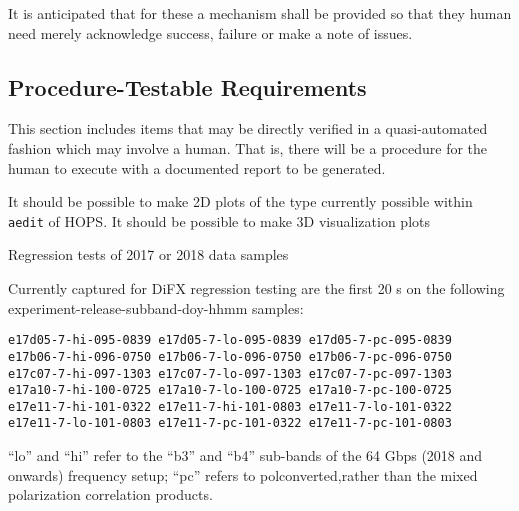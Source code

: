 It is anticipated that for these a mechanism shall be provided
so that they human need merely acknowledge success, failure or
make a note of issues.

\subsection{Procedure-Testable Requirements}
\label{sec:procedure}

This section includes items that may be directly verified in a quasi-automated
fashion which may involve a human.  That is, there will be a procedure for the
human to execute with a documented report to be generated.

\begin{description}
 It should be possible to make 2D plots of the type
    currently possible within \texttt{\ac{aedit}} of \ac{HOPS}.
 It should be possible to make 3D visualization plots

 Regression tests of 2017 or 2018 data samples

    \FIXME[more]

\end{description}

Currently captured for \ac{DiFX} regression testing are the first 20 s
on the following experiment-release-subband-doy-hhmm samples:
\begin{verbatim}
e17d05-7-hi-095-0839 e17d05-7-lo-095-0839 e17d05-7-pc-095-0839
e17b06-7-hi-096-0750 e17b06-7-lo-096-0750 e17b06-7-pc-096-0750
e17c07-7-hi-097-1303 e17c07-7-lo-097-1303 e17c07-7-pc-097-1303
e17a10-7-hi-100-0725 e17a10-7-lo-100-0725 e17a10-7-pc-100-0725
e17e11-7-hi-101-0322 e17e11-7-hi-101-0803 e17e11-7-lo-101-0322
e17e11-7-lo-101-0803 e17e11-7-pc-101-0322 e17e11-7-pc-101-0803
\end{verbatim}
``lo'' and ``hi'' refer to the ``b3'' and ``b4'' sub-bands of the
64 \acs{Gbps} (2018 and onwards) frequency setup; ``pc'' refers to polconverted,rather than the mixed polarization correlation products.

